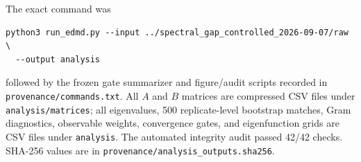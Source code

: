 \documentclass[10pt]{article}
\begin{document}
The exact command was
\begin{verbatim}
python3 run_edmd.py --input ../spectral_gap_controlled_2026-09-07/raw \
  --output analysis
\end{verbatim}
followed by the frozen gate summarizer and figure/audit scripts recorded in
\texttt{provenance/commands.txt}.  All $A$ and $B$ matrices are compressed CSV
files under \texttt{analysis/matrices}; all eigenvalues, 500 replicate-level
bootstrap matches, Gram diagnostics, observable weights, convergence gates,
and eigenfunction grids are CSV files under \texttt{analysis}.  The automated
integrity audit passed 42/42 checks.  SHA-256 values are in
\texttt{provenance/analysis\_outputs.sha256}.
\end{document}
